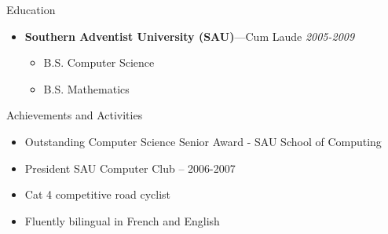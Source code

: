 \documentclass[11pt,oneside]{article}
\newenvironment{ressection}[1]{
	\vspace{4pt}
	{\fontfamily{phv}\selectfont\Large#1}
	\begin{itemize}
	\vspace{3pt}
}{
	\end{itemize}
}
\newcommand{\resitem}[1]{
	\vspace{-4pt}
	\item \begin{flushleft} #1 \end{flushleft}
}
\newcommand{\resbigitem}[3]{
	\vspace{-5pt}
	\item
	{\textbf{#1}---#2 \hfill \textit{#3}}
}
\newenvironment{restitledposition}[3]{
	\resbigitem{#1}{#2}{#3}
	\vspace{-2pt}
	\begin{itemize}
}{
	\end{itemize}
}
\begin{document}
\begin{ressection}{Education}
	\begin{restitledposition}{Southern Adventist University (SAU)}{Cum Laude}{2005-2009}
		\resitem{B.S. Computer Science}
		\resitem{B.S. Mathematics}
	\end{restitledposition}
\end{ressection}


\begin{ressection}{Achievements and Activities}

	\resitem{Outstanding Computer Science Senior Award - SAU School of Computing}
	\resitem{President SAU Computer Club -- 2006-2007}
	\resitem{Cat 4 competitive road cyclist}
  \resitem{Fluently bilingual in French and English}

\end{ressection}
\end{document}
